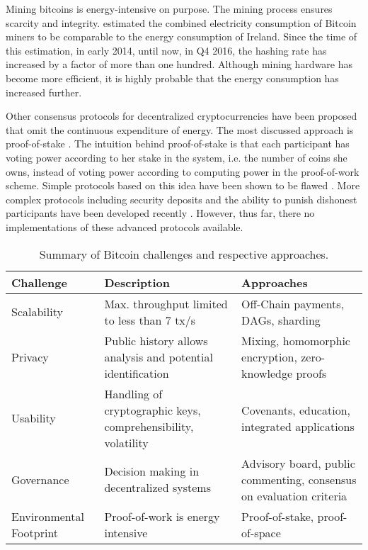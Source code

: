 Mining bitcoins is energy-intensive on purpose. The mining process ensures scarcity and integrity. \cite{6912770} estimated the combined electricity consumption of Bitcoin miners to be comparable to the energy consumption of Ireland. Since the time of this estimation, in early 2014, until now, in Q4 2016, the hashing rate has increased by a factor of more than one hundred. Although mining hardware has become more efficient, it is highly probable that the energy consumption has increased further.

Other consensus protocols for decentralized cryptocurrencies have been proposed that omit the continuous expenditure of energy. The most discussed approach is proof-of-stake \parencite{pos2011}. The intuition behind proof-of-stake is that each participant has voting power according to her stake in the system, i.e. the number of coins she owns, instead of voting power according to computing power in the proof-of-work scheme. Simple protocols based on this idea have been shown to be flawed \parencite{poelstra2014}. More complex protocols including security deposits and the ability to punish dishonest participants have been developed recently \parencite{kiayias2016,bentov2016snowwhite}. However, thus far, there no implementations of these advanced protocols available. 



\begin{table}\footnotesize
  \centering
  \begin{tabularx}{\textwidth}{ p{1.5cm} p{4.5cm} X }
    \toprule
    \textbf{Challenge} & \textbf{Description} & \textbf{Approaches} \\
    \midrule
    Scalability & Max. throughput limited to less than 7 tx/s & Off-Chain payments, \ac{DAG}s, sharding \\
    Privacy & Public history allows analysis and potential identification  & Mixing, homomorphic encryption, zero-knowledge proofs  \\
    Usability & Handling of cryptographic keys, comprehensibility, volatility & Covenants, education, integrated applications  \\
    Governance & Decision making in decentralized systems & Advisory board, public commenting, consensus on evaluation criteria  \\
    Environmental Footprint & Proof-of-work is energy intensive & Proof-of-stake, proof-of-space \\
    \bottomrule
  \end{tabularx}
  \caption{Summary of Bitcoin challenges and respective approaches.}
  \label{tbl:crypto:challenges}
\end{table}


